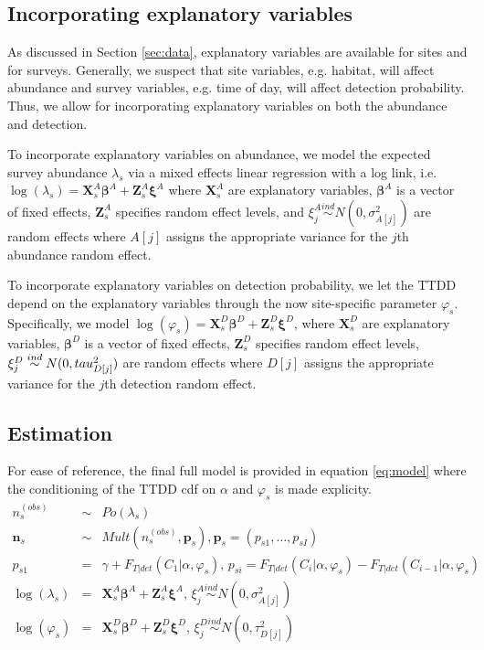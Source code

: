 \documentclass[useAMS,usenatbib,referee,12pt]{article}
\newcommand{\vn}{\textbf{n}}
\newcommand{\vp}{\textbf{p}}
\newcommand{\vX}{\textbf{X}}
\newcommand{\vZ}{\textbf{Z}}
\newcommand{\vbeta}{\boldsymbol{\beta}}
\newcommand{\vxi}{\boldsymbol{\xi}}
\begin{document}
\subsection{Incorporating explanatory variables}\label{sec:covariates}

As discussed in Section \ref{sec:data}, explanatory variables are available for sites and for surveys. 
Generally, we suspect that site variables, e.g. habitat, will affect abundance and survey variables, e.g. time of day, will affect detection probability. 
Thus, we allow for incorporating explanatory variables on both the abundance and detection.

To incorporate explanatory variables on abundance, we model the expected survey abundance $\lambda_{s}$ via a mixed effects linear regression with a log link, i.e. $\log (\lambda_{s}) = \vX_{s}^A\vbeta^A + \vZ_{s}^A\vxi^A$ where $\vX_{s}^A$ are explanatory variables, $\vbeta^A$ is a vector of fixed effects, $\vZ_{s}^A$ specifies random effect levels, and $\xi_j^A \overset{ind}{\sim} N(0,\sigma_{A[j]}^2)$ are random effects where $A[j]$ assigns the appropriate variance for the $j$th abundance random effect.  

To incorporate explanatory variables on detection probability, we let the TTDD depend on the explanatory variables through the now site-specific parameter $\varphi_s$. 
Specifically, we model $\log(\varphi_{s}) = \vX_{s}^D\vbeta^D + \vZ_{s}^D\vxi^D$, where $\vX_{s}^D$ are explanatory variables, $\vbeta^D$ is a vector of fixed effects, $\vZ_{s}^D$ specifies random effect levels, $\xi_j^D \overset{ind}{\sim} N(0,\\tau_{D[j]}^2)$ are random effects where $D[j]$ assigns the appropriate variance for the $j$th detection random effect. 




\subsection{Estimation}

For ease of reference, the final full model is provided in equation \eqref{eq:model} where the conditioning of the TTDD cdf on $\alpha$ and $\varphi_s$ is made explicity. 
\begin{subequations}
\begin{eqnarray} \label{eq:model}
n_s^{(obs)} &\sim& Po(\lambda_s) \\
\vn_s &\sim& Mult(n_s^{(obs)}, \vp_s), \vp_s = (p_{s1},\dots,p_{sI}) \\
p_{s1} &=& \gamma + F_{T|det}(C_1|\alpha,\varphi_s),\, p_{si} = F_{T|det}(C_i|\alpha,\varphi_s)-F_{T|det}(C_{i-1}|\alpha,\varphi_s)\\
\log(\lambda_s) &=& \vX_{s}^A\vbeta^A + \vZ_{s}^A\vxi^A,\, \xi_j^A \overset{ind}{\sim} N(0,\sigma_{A[j]}^2) \\
\log(\varphi_{s}) &=& \vX_{s}^D\vbeta^D + \vZ_{s}^D\vxi^D,\, \xi_j^D \overset{ind}{\sim} N(0,\tau_{D[j]}^2)
\end{eqnarray}
\end{subequations}
\end{document}
